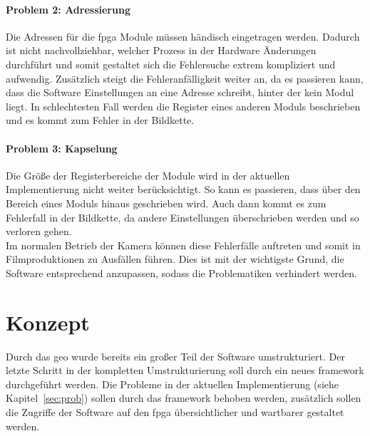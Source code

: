 \paragraph*{Problem 2: Adressierung} Die Adressen für die \ac{fpga} Module müssen händisch eingetragen werden. Dadurch ist nicht nachvollziehbar, welcher Prozess in der Hardware Änderungen durchführt und somit gestaltet sich die Fehlersuche extrem kompliziert und aufwendig. Zusätzlich steigt die Fehleranfälligkeit weiter an, da es passieren kann, dass die Software Einstellungen an eine Adresse schreibt, hinter der kein Modul liegt. In schlechtesten Fall werden die Register eines anderen Moduls beschrieben und es kommt zum Fehler in der Bildkette. 

\paragraph*{Problem 3: Kapselung} Die Größe der Registerbereiche der Module wird in der aktuellen Implementierung nicht weiter berücksichtigt. So kann es passieren, dass über den Bereich eines Moduls hinaus geschrieben wird. Auch dann kommt es zum Fehlerfall in der Bildkette, da andere Einstellungen überschrieben werden und so verloren gehen. \\



Im normalen Betrieb der Kamera können diese Fehlerfälle auftreten und somit in Filmproduktionen zu Ausfällen führen. Dies ist mit der wichtigste Grund, die Software entsprechend anzupassen, sodass die Problematiken verhindert werden.


\section{Konzept}\label{sec:konzept}
Durch das \ac{geo} wurde bereits ein großer Teil der Software umstrukturiert. Der letzte Schritt in der kompletten Umstrukturierung soll durch ein neues \gls{framework} durchgeführt werden. 
Die Probleme in der aktuellen Implementierung (siehe Kapitel~\ref{sec:prob}) 
sollen durch das \gls{framework} behoben werden, zusätzlich sollen die Zugriffe der Software auf den \ac{fpga} übersichtlicher und wartbarer gestaltet werden.

